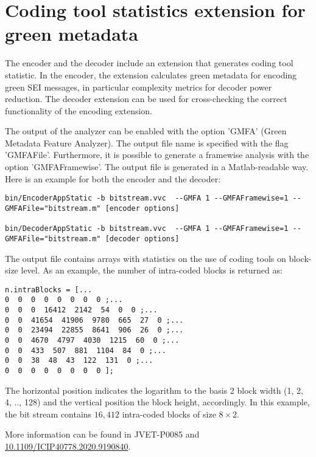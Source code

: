 \documentclass[a4paper,11pt]{jvetdoc}
\begin{document}
\section{Coding tool statistics extension for green metadata}
\label{sec:green-meta-sei}

The encoder and the decoder include an extension that generates coding tool statistic. In the encoder, the extension calculates green metadata for encoding green SEI messages, in particular complexity metrics for decoder power reduction. The decoder extension can be used for cross-checking the correct functionality of the encoding extension.

The output of the analyzer can be enabled with the option 'GMFA' (Green Metadata Feature Analyzer). The output file name is specified with the flag 'GMFAFile'.
Furthermore, it is possible to generate a framewise analysis with the option 'GMFAFramewise'. The output file is generated in a Matlab-readable way. Here is an example for both the encoder and the decoder:

\begin{verbatim}
bin/EncoderAppStatic -b bitstream.vvc  --GMFA 1 --GMFAFramewise=1 --GMFAFile="bitstream.m" [encoder options]

bin/DecoderAppStatic -b bitstream.vvc  --GMFA 1 --GMFAFramewise=1 --GMFAFile="bitstream.m" [decoder options]
\end{verbatim}

The output file contains arrays with statistics on the use of coding tools on block-size level. As an example, the number of intra-coded blocks is returned as:

\begin{verbatim}
n.intraBlocks = [...
0  0  0  0  0  0  0  0 ;...
0  0  0  16412  2142  54  0  0 ;...
0  0  41654  41906  9780  665  27  0 ;...
0  0  23494  22855  8641  906  26  0 ;...
0  0  4670  4797  4030  1215  60  0 ;...
0  0  433  507  881  1104  84  0 ;...
0  0  38  48  43  122  131  0 ;...
0  0  0  0  0  0  0  0 ];
\end{verbatim}

The horizontal position indicates the logarithm to the basis 2 block width (1, 2, 4, .., 128) and the vertical position the block height, accordingly. In this example, the bit stream contains $16{,}412$ intra-coded blocks of size $8\times 2$.

More information can be found in JVET-P0085 and \url{10.1109/ICIP40778.2020.9190840}.
\end{document}
